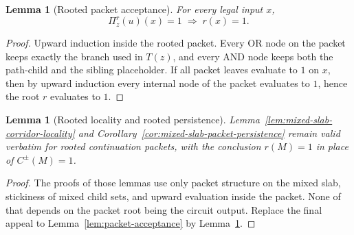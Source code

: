 \documentclass[11pt]{article}
\newtheorem{lemma}[theorem]{Lemma}
\begin{document}
\begin{lemma}[Rooted packet acceptance]
\label{lem:rooted-packet-acceptance}
For every legal input $x$,
\[
  \Pi^r_z(u)(x) = 1 \;\Longrightarrow\; r(x) = 1.
\]
\end{lemma}

\begin{proof}
Upward induction inside the rooted packet.  Every OR node on the packet
keeps exactly the branch used in $T(z)$, and every AND node keeps both
the path-child and the sibling placeholder.  If all packet leaves
evaluate to $1$ on $x$, then by upward induction every internal node of
the packet evaluates to $1$, hence the root $r$ evaluates to $1$.
\end{proof}

\begin{lemma}[Rooted locality and rooted persistence]
\label{lem:rooted-locality-persistence}
Lemma~\ref{lem:mixed-slab-corridor-locality}
and Corollary~\ref{cor:mixed-slab-packet-persistence} remain valid verbatim for
rooted continuation packets, with the conclusion $r(M)=1$ in place of
$C^{\pm}(M)=1$.
\end{lemma}

\begin{proof}
The proofs of those lemmas use only packet structure on the mixed slab,
stickiness of mixed child sets, and upward evaluation inside the packet.
None of that depends on the packet root being the circuit output.
Replace the final appeal to Lemma~\ref{lem:packet-acceptance} by
Lemma~\ref{lem:rooted-packet-acceptance}.
\end{proof}
\end{document}
